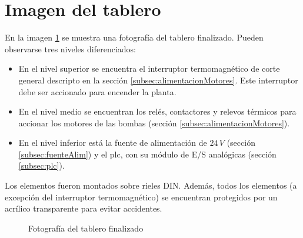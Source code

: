 \section{Imagen del tablero}
En la imagen \ref{fig:fotoTablero} se muestra
una fotografía del tablero finalizado. 
Pueden observarse tres niveles diferenciados:
\begin{itemize}
 \item En el nivel superior se encuentra el interruptor termomagnético de corte
general descripto en la sección \ref{subsec:alimentacionMotores}.
Este interruptor debe ser accionado para encender la planta.
\item En el nivel medio se encuentran los relés, contactores y relevos térmicos
para accionar los motores de las bombas (sección
\ref{subsec:alimentacionMotores}).
\item En el nivel inferior está la fuente de alimentación de $24\,V$ (sección
\ref{subsec:fuenteAlim}) y el
\gls{plc}, con su módulo de E/S analógicas (sección \ref{subsec:plc}).
\end{itemize}
Los elementos fueron montados sobre
rieles DIN.  Además, todos los elementos (a excepción del interruptor
termomagnético) se encuentran protegidos por un acrílico transparente para
evitar accidentes.

\begin{figure}[ht]
 \centering
 \caption{Fotografía del tablero finalizado}
 \label{fig:fotoTablero}
\end{figure}
